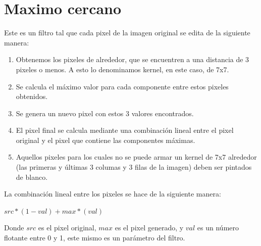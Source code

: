 \section{Maximo cercano}

Este es un filtro tal que cada pixel de la imagen original se edita de la siguiente manera:

\begin{enumerate}
	\item Obtenemos los pixeles de alrededor, que se encuentren a una distancia de 3 pixeles o menos. A esto lo denominamos kernel, en este caso, de 7x7.

	\item Se calcula el máximo valor para cada componente entre estos pixeles obtenidos.

	\item Se genera un nuevo pixel con estos 3 valores encontrados.

	\item El pixel final se calcula mediante una combinación lineal entre el pixel original y el pixel que contiene las componentes máximas.

	\item Aquellos pixeles para los cuales no se puede armar un kernel de 7x7 alrededor (las primeras y últimas 3 columas y 3 filas de la imagen) deben ser pintados de blanco.
\end{enumerate}

La combinación lineal entre los pixeles se hace de la siguiente manera:

\begin{center}
	$src * (1 - val) + max * (val)$
\end{center}

Donde $src$ es el pixel original, $max$ es el pixel generado, y $val$ es un número flotante entre 0 y 1, este mismo es un parámetro del filtro.

